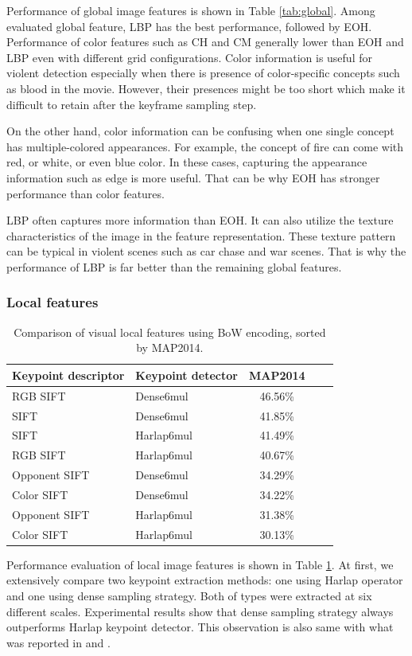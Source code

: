 \documentclass[twocolumn]{bmcart}%
\begin{document}
Performance of global image features is shown in Table \ref{tab:global}. Among evaluated global feature, LBP has the best performance, followed by EOH. Performance of color features such as CH and CM generally lower than EOH and LBP even with different grid configurations. Color information is useful for violent detection especially when there is presence of color-specific concepts such as blood in the movie. However, their presences might be too short which make it difficult to retain after the keyframe sampling step.

On the other hand, color information can be confusing when one single concept has multiple-colored appearances. For example, the concept of fire can come with red, or white, or even blue color. In these cases, capturing the appearance information such as edge is more useful. That can be why EOH has stronger performance than color features. 

LBP often captures more information than EOH. It can also utilize the texture characteristics of the image in the feature representation. These texture pattern can be typical in violent scenes such as car chase and war scenes. That is why the performance of LBP is far better than the remaining global features.
\subsubsection{Local features}

\begin{table}
	\centering
	\caption{Comparison of visual local features using BoW encoding, sorted by MAP2014.}
	\begin{tabular}{llccc}
		\hline
		Keypoint descriptor & Keypoint detector & MAP2014 \\ \hline
		RGB SIFT & Dense6mul & 46.56\% \\
		SIFT  & Dense6mul & 41.85\% \\
		SIFT  & Harlap6mul & 41.49\% \\
		RGB SIFT & Harlap6mul & 40.67\% \\
		Opponent SIFT & Dense6mul  & 34.29\% \\
		Color SIFT & Dense6mul  & 34.22\% \\
		Opponent SIFT & Harlap6mul & 31.38\% \\
		Color SIFT & Harlap6mul & 30.13\% \\ \hline
	\end{tabular}%
	\label{tab:local}%
\end{table}%
Performance evaluation of local image features is shown in Table \ref{tab:local}. At first, we extensively compare two keypoint extraction methods: one using Harlap operator and one using dense sampling strategy. Both of types were extracted at six different scales. Experimental results show that dense sampling strategy always outperforms Harlap keypoint detector. This observation is also same with what was reported in \cite{bosch2006scene} and \cite{bosch2007image}.
\end{document}
